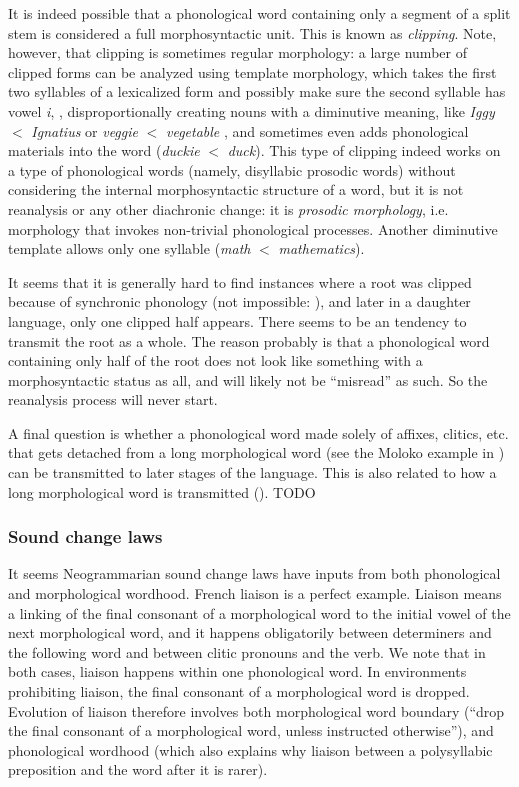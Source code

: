 \documentclass[a4paper, oneside, scheme=plain, 12pt]{article}
\newcommand*{\term}[1]{\emph{#1}}
\newcommand{\form}[1]{\emph{#1}}
\newcommand*{\textlt}{$<$ }
\begin{document}
It is indeed possible that a phonological word containing only
a segment of a split stem is considered a full morphosyntactic unit.
This is known as \term{clipping}.
Note, however, that clipping is sometimes regular morphology:
a large number of clipped forms can be analyzed using template morphology,
which takes the first two syllables of a lexicalized form
and possibly make sure the second syllable has vowel \form{i},
\citep{bat2019templatic},
disproportionally creating nouns with a diminutive meaning,
like \form{Iggy} \textlt \form{Ignatius} or \form{veggie} \textlt \form{vegetable}
\citep{jamet2009morphophonological},
and sometimes even adds phonological materials into the word
(\form{duckie} \textlt \form{duck}).
This type of clipping indeed works on a type of phonological words
(namely, disyllabic prosodic words)
without considering the internal morphosyntactic structure of a word,
but it is not reanalysis or any other diachronic change:
it is \emph{prosodic morphology},
i.e. morphology that invokes non-trivial phonological processes. 
Another diminutive template allows only one syllable (\form{math} \textlt \form{mathematics}).

It seems that it is generally hard to find instances where a root was clipped because of synchronic phonology
(not impossible: ),
and later in a daughter language, only one clipped half appears.
There seems to be an tendency to transmit the root as a whole.
The reason probably is that a phonological word containing only half of the root
does not look like something with a morphosyntactic status as all,
and will likely not be ``misread'' as such.
So the reanalysis process will never start.

A final question is whether a phonological word made solely of affixes, clitics, etc.
that gets detached from a long morphological word
(see the Moloko example in )
can be transmitted to later stages of the language.
This is also related to how a long morphological word is transmitted
(). TODO

\subsubsection{Sound change laws}\label{sec:sound-change-law}

It seems Neogrammarian sound change laws have inputs from both phonological and morphological wordhood.
French liaison is a perfect example.
Liaison means a linking of the final consonant of a morphological word to the initial vowel of the next morphological word,
and it happens obligatorily between determiners and the following word
and between clitic pronouns and the verb.
We note that in both cases, liaison happens within one phonological word.
In environments prohibiting liaison, the final consonant of a morphological word is dropped.
Evolution of liaison therefore involves both morphological word boundary
(``drop the final consonant of a morphological word, unless instructed otherwise''),
and phonological wordhood (which also explains why liaison between a polysyllabic preposition and the word after it is rarer).
\end{document}
